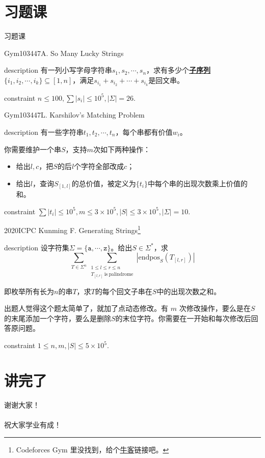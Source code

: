 \documentclass{beamer}
\theoremstyle{compact}
\def\obj#1{\textbf{\uline{#1}}}
\def\le{\leqslant}
\begin{document}
\section{习题课}
\begin{frame}
	\begin{center}
		{\huge 习题课}
	\end{center}
\end{frame}
\begin{frame}{Gym103447A. So Many Lucky Strings}
	\begin{block}{description}
		有一列小写字母字符串$s_1, s_2, \cdots, s_n$，求有多少个\obj{子序列}$\{i_1, i_2, \cdots, i_k\} \subseteq [1, n]$，满足$s_{i_1} + s_{i_2} + \cdots + s_{i_k}$是回文串。
	\end{block}
	\begin{block}{constraint}
		$n \le 100, \sum |s_i| \le 10^5, |\Sigma| = 26.$
	\end{block}
\end{frame}
\begin{frame}{Gym103447L. Karshilov's Matching Problem}
	\begin{block}{description}
		有一些字符串$t_1, t_2, \cdots, t_n$，每个串都有价值$w_i$。

		你需要维护一个串$S$，支持$m$次如下两种操作：\begin{itemize}
			\item 给出$l, c$，把$S$的后$l$个字符全部改成$c$；
			\item 给出$l$，查询$S_{[1, l]}$的总价值，被定义为$\{t_i\}$中每个串的出现次数乘上价值的和。
		\end{itemize}
	\end{block}
	\begin{block}{constraint}
		$\sum |t_i| \le 10^5, m \le 3 \times 10^5, |S| \le 3 \times 10^5, |\Sigma| = 10.$
	\end{block}
\end{frame}
\begin{frame}{2020ICPC Kunming F. Generating Strings\footnote{\tiny Codeforces Gym 里没找到，给个\href{https://ac.nowcoder.com/acm/contest/12548/F}{牛客}链接吧。}}
	\begin{block}{description}
		设字符集$\Sigma = \{\texttt{a}, \cdots, \texttt{z}\}$。给出$S \in \Sigma^*$，求$$\sum_{T \in \Sigma^n} \sum_{\substack{1 \le l \le r \le n \\ T_{[l, r]} \mathrm{\ is\ palindrome}}} |\mathrm{endpos}_S(T_{[l, r]})|$$

		即枚举所有长为$n$的串$T$，求$T$的每个回文子串在$S$中的出现次数之和。

		出题人觉得这个题太简单了，就加了点动态修改。有 $m$ 次修改操作，要么是在$S$的末尾添加一个字符，要么是删除$S$的末位字符。你需要在一开始和每次修改后回答原问题。
	\end{block}
	\begin{block}{constraint}
		$1 \le n, m, |S| \le 5 \times 10^5.$
	\end{block}
\end{frame}
\section{讲完了}
\begin{frame}
	\begin{center}
		{\huge 谢谢大家！\\~\\  \large 祝大家学业有成！}
	\end{center}
\end{frame}
\end{document}
